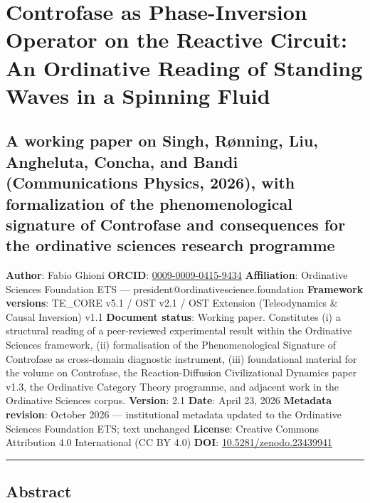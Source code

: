 \documentclass[
  11pt,
  a4paper,
]{article}
\author{}
\date{}
\begin{document}
{
\setcounter{tocdepth}{3}
\tableofcontents
}
\section{Controfase as Phase-Inversion Operator on the Reactive Circuit:
An Ordinative Reading of Standing Waves in a Spinning
Fluid}\label{controfase-as-phase-inversion-operator-on-the-reactive-circuit-an-ordinative-reading-of-standing-waves-in-a-spinning-fluid}

\subsection{A working paper on Singh, Rønning, Liu, Angheluta, Concha,
and Bandi (Communications Physics, 2026), with formalization of the
phenomenological signature of Controfase and consequences for the
ordinative sciences research
programme}\label{a-working-paper-on-singh-ruxf8nning-liu-angheluta-concha-and-bandi-communications-physics-2026-with-formalization-of-the-phenomenological-signature-of-controfase-and-consequences-for-the-ordinative-sciences-research-programme}

\textbf{Author}: Fabio Ghioni \textbf{ORCID}:
\href{https://orcid.org/0009-0009-0415-9434}{0009-0009-0415-9434}
\textbf{Affiliation}: Ordinative Sciences Foundation ETS ---
president@ordinativescience.foundation \textbf{Framework versions}:
TE\_CORE v5.1 / OST v2.1 / OST Extension (Teleodynamics \& Causal
Inversion) v1.1 \textbf{Document status}: Working paper. Constitutes (i)
a structural reading of a peer-reviewed experimental result within the
Ordinative Sciences framework, (ii) formalisation of the
Phenomenological Signature of Controfase as cross-domain diagnostic
instrument, (iii) foundational material for the volume on Controfase,
the Reaction-Diffusion Civilizational Dynamics paper v1.3, the
Ordinative Category Theory programme, and adjacent work in the
Ordinative Sciences corpus. \textbf{Version}: 2.1 \textbf{Date}: April
23, 2026 \textbf{Metadata revision}: October 2026 --- institutional
metadata updated to the Ordinative Sciences Foundation ETS; text
unchanged \textbf{License}: Creative Commons Attribution 4.0
International (CC BY 4.0) \textbf{DOI}:
\href{https://doi.org/10.5281/zenodo.23439941}{10.5281/zenodo.23439941}

\begin{center}\rule{0.5\linewidth}{0.5pt}\end{center}

\subsection{Abstract}\label{abstract}
\end{document}
